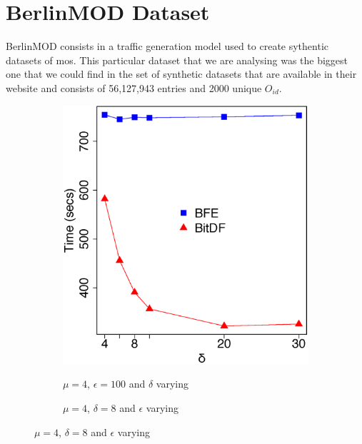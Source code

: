 {\section{BerlinMOD Dataset}
\label{sec:berlinmod}
BerlinMOD consists in a traffic generation model \citep{berlinmodpaper} used to create sythentic datasets of \acp{mo}.
This particular dataset that we are analysing was the biggest one that we could find in the set of synthetic datasets
that are available in their website \citep{berlinmod} and consists of 56,127,943 entries and 2000 unique $O_{id}$.

\begin{figure}[h!]
    \centering
    \caption{Results varying $\delta$ and $\epsilon$ for BerlinMOD dataset}
    \begin{subfigure}[t]{0.48\textwidth}
        \caption{$\mu = 4$, $\epsilon = 100$ and $\delta$ varying}
        \includegraphics[width=\textwidth]{images/BerlinMOD_n_4_g_100_varying_l.eps}
        \label{fig:berlinmod_vary_l}
    \end{subfigure}
    \begin{subfigure}[t]{0.48\textwidth}
        \caption{$\mu = 4$, $\delta = 8$ and $\epsilon$ varying}

\end{subfigure}
\end{figure}}
